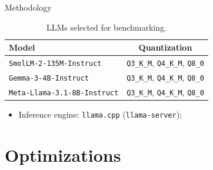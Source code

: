 \documentclass[aspectratio=169, handout]{beamer}
\begin{document}
\begin{frame}{Methodology}
    \begin{table}[H]
        \centering
        \begin{tabular}{|l|c|}
            \hline
            \textbf{Model}       &
            \textbf{Quantization} \\ \hline

            \texttt{SmolLM-2-135M-Instruct}                      &
            \texttt{Q3\_K\_M}, \texttt{Q4\_K\_M}, \texttt{Q8\_0} \\ \hline

            \texttt{Gemma-3-4B-Instruct}                         &
            \texttt{Q3\_K\_M}, \texttt{Q4\_K\_M}, \texttt{Q8\_0} \\ \hline

            \texttt{Meta-Llama-3.1-8B-Instruct}                  &
            \texttt{Q3\_K\_M}, \texttt{Q4\_K\_M}, \texttt{Q8\_0} \\ \hline
        \end{tabular}

        \caption{LLMs selected for benchmarking.}
    \end{table}

    \begin{itemize}
        \item Inference engine: \texttt{llama.cpp} (\texttt{llama-server});
    \end{itemize}
\end{frame}

\section{Optimizations}
\end{document}
